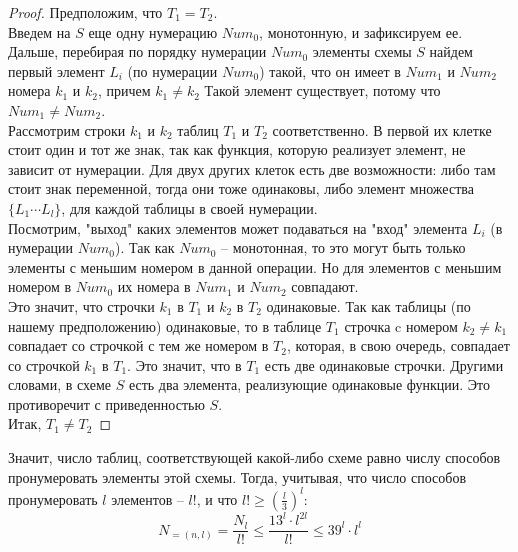 \begin{proof}
Предположим, что $T_1 = T_2$.\\
Введем на $S$ еще одну нумерацию $Num_0$, монотонную, и зафиксируем ее. Дальше, перебирая по порядку нумерации $Num_0$ элементы схемы $S$ найдем первый элемент $L_i$ (по нумерации $Num_0$) такой, что он имеет в $Num_1$ и $Num_2$ номера $k_1$ и $k_2$, причем $k_1 \neq k_2$ Такой элемент существует, потому что $Num_1 \neq Num_2$.\\ Рассмотрим строки $k_1$ и $k_2$ таблиц $T_1$ и $T_2$ соответственно. 
В первой их клетке стоит один и тот же знак, так как функция, которую реализует элемент, не зависит от нумерации. Для двух других клеток есть две возможности: либо там стоит знак переменной, тогда они тоже одинаковы, либо элемент множества $\{ L_1 \cdots L_l\} $, для каждой таблицы в своей нумерации. \\
Посмотрим, "выход" каких элементов может подаваться на "вход" элемента $L_i$ (в нумерации $Num_0$). Так как $Num_0$ -- монотонная, то  это могут быть только элементы с меньшим номером в данной операции.  Но для элементов с меньшим номером в $Num_0$ их номера в $Num_1$ и $Num_2$ совпадают. \\
Это значит, что строчки $k_1$ в $T_1$ и $k_2$ в $T_2$ одинаковые. Так как таблицы (по нашему предположению) одинаковые, то в таблице $T_1$ строчка c номером $k_2 \neq k_1$ совпадает со строчкой с тем же номером в $T_2$, которая, в свою очередь, совпадает со строчкой $k_1$ в $T_1$. Это значит, что в $T_1$ есть две одинаковые строчки. Другими словами, в схеме $S$ есть два элемента, реализующие одинаковые функции. Это противоречит с приведенностью $S$.\\
Итак, $T_1 \neq T_2$
\end{proof}
Значит, число таблиц, соответствующей какой-либо схеме равно числу способов пронумеровать элементы этой схемы.
Тогда, учитывая, что число способов пронумеровать $l$ элементов -- $l!$, и что $l! \geq (\frac{l}{3})^l $:\\
$$ N_{=(n,l)}=\frac{N_l}{l!} \leq \frac{13^l\cdot l^{2l}}{l!} \leq 39^l\cdot l^l $$


